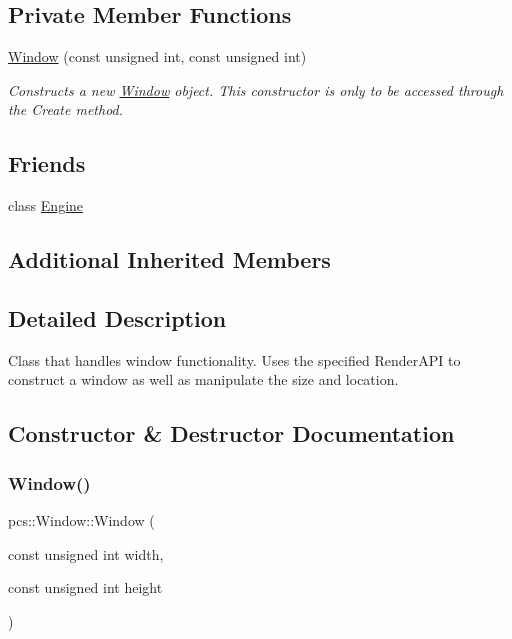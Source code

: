 \subsection*{Private Member Functions}
\begin{DoxyCompactItemize}
\item 
\hyperlink{classpcs_1_1Window_a0cdc3df7646ee4e08fa85d3e9d5fddd4}{Window} (const unsigned int, const unsigned int)
\begin{DoxyCompactList}\small\item\em Constructs a new \hyperlink{classpcs_1_1Window}{Window} object. This constructor is only to be accessed through the Create method. \end{DoxyCompactList}\end{DoxyCompactItemize}
\subsection*{Friends}
\begin{DoxyCompactItemize}
\item 
class \hyperlink{classpcs_1_1Window_a3e1914489e4bed4f9f23cdeab34a43dc}{Engine}
\end{DoxyCompactItemize}
\subsection*{Additional Inherited Members}


\subsection{Detailed Description}
Class that handles window functionality. Uses the specified Render\+A\+PI to construct a window as well as manipulate the size and location. 

\subsection{Constructor \& Destructor Documentation}
\mbox{\label{classpcs_1_1Window_a0cdc3df7646ee4e08fa85d3e9d5fddd4}} 
\subsubsection{\texorpdfstring{Window()}{Window()}}
{\footnotesize\ttfamily pcs\+::\+Window\+::\+Window (\begin{DoxyParamCaption}\item[{const unsigned int}]{width,  }\item[{const unsigned int}]{height }\end{DoxyParamCaption})\hspace{0.3cm}{\ttfamily [private]}}



